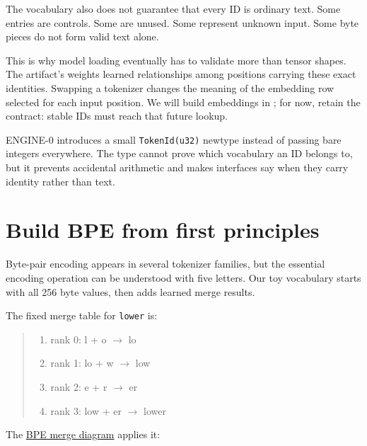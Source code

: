 The vocabulary also does not guarantee that every ID is ordinary text.
Some entries are controls. Some are unused. Some represent unknown
input. Some byte pieces do not form valid text alone.

This is why model loading eventually has to validate more than tensor
shapes. The artifact's weights learned relationships among positions
carrying these exact identities. Swapping a tokenizer changes the
meaning of the embedding row selected for each input position. We will
build embeddings in ; for now, retain the contract: stable IDs
must reach that future lookup.

ENGINE-0 introduces a small \texttt{TokenId(u32)} newtype instead of
passing bare integers everywhere. The type cannot prove which vocabulary
an ID belongs to, but it prevents accidental arithmetic and makes
interfaces say when they carry identity rather than text.

\section{Build BPE from first
principles}\label{build-bpe-from-first-principles}

Byte-pair encoding appears in several tokenizer families, but the
essential encoding operation can be understood with five letters. Our
toy vocabulary starts with all 256 byte values, then adds learned merge
results.

The fixed merge table for \texttt{lower} is:

\begin{quote}
\begin{enumerate}
\item rank 0: l   + o    \(\longrightarrow\)  lo
\item rank 1: lo  + w    \(\longrightarrow\)  low
\item rank 2: e   + r    \(\longrightarrow\)  er
\item rank 3: low + er   \(\longrightarrow\)  lower
\end{enumerate}
\end{quote}

The
\href{https://github.com/hermonai/inside-the-llm-engine/blob/astra-visual-rewrite/diagrams/tokenizer/bpe-merge-process.txt}{BPE
merge diagram} applies it:


